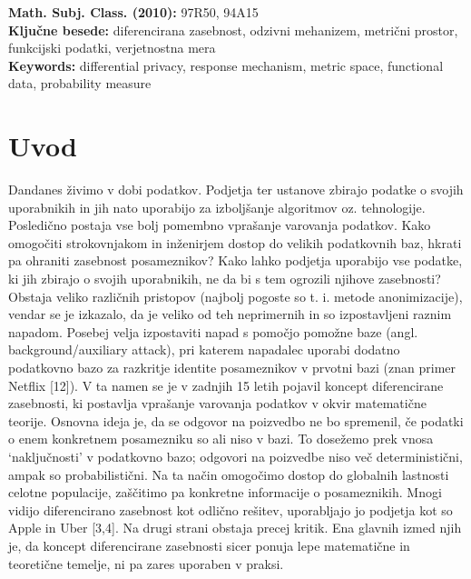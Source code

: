 \documentclass[12pt,a4paper]{amsart}
\theoremstyle{definition} %
\theoremstyle{plain} %
\begin{document}
\vfill\noindent
{\bf Math. Subj. Class. (2010):} 97R50, 94A15  \\[1mm]  
{\bf Ključne besede:} diferencirana zasebnost, odzivni mehanizem, metrični prostor, funkcijski podatki, verjetnostna mera  \\[1mm]  
{\bf Keywords:} differential privacy, response mechanism, metric space, functional data, probability measure
\pagebreak



\section{Uvod}
Dandanes živimo v dobi podatkov. Podjetja ter ustanove zbirajo podatke o svojih uporabnikih in jih nato uporabijo za izboljšanje algoritmov oz. tehnologije. Posledično postaja vse bolj pomembno  vprašanje  varovanja podatkov. Kako omogočiti strokovnjakom in inženirjem dostop do velikih podatkovnih baz, hkrati pa ohraniti zasebnost posameznikov? Kako lahko podjetja uporabijo vse podatke, ki jih zbirajo o svojih uporabnikih, ne da bi s tem ogrozili njihove zasebnosti? Obstaja veliko različnih pristopov (najbolj pogoste so t. i. metode anonimizacije), vendar se je izkazalo, da je veliko od teh neprimernih in so izpostavljeni raznim napadom. Posebej velja izpostaviti napad s pomočjo pomožne baze (angl. background/auxiliary attack), pri katerem napadalec uporabi dodatno podatkovno bazo za razkritje identite posameznikov v prvotni bazi (znan primer Netflix [12]).  V ta namen se je v zadnjih 15 letih pojavil koncept diferencirane zasebnosti, ki postavlja vprašanje varovanja podatkov v okvir matematične teorije.  Osnovna ideja je, da se odgovor na poizvedbo ne bo spremenil, če podatki o enem konkretnem posamezniku so ali niso v bazi. To dosežemo prek vnosa `naključnosti' v podatkovno bazo; odgovori na poizvedbe niso več deterministični, ampak so probabilistični. Na ta način omogočimo dostop do globalnih lastnosti celotne populacije, zaščitimo pa konkretne informacije o posameznikih. Mnogi vidijo diferencirano zasebnost kot odlično rešitev, uporabljajo jo podjetja kot so Apple in Uber [3,4]. Na drugi strani obstaja precej kritik. Ena glavnih izmed njih je, da koncept diferencirane zasebnosti sicer ponuja lepe matematične in teoretične temelje, ni pa zares uporaben v praksi. 
\newline
\newline
\end{document}
